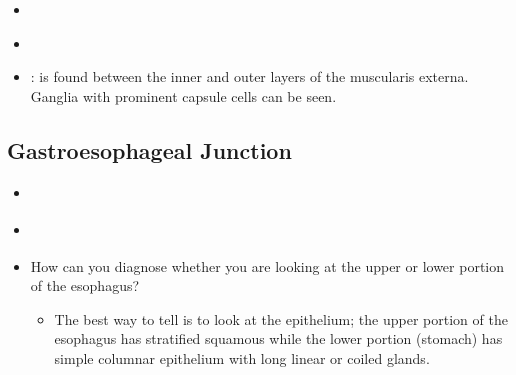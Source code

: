 \begin{itemize}
\begin{multicols}{2}
\begin{itemize}
    \item {}
    
    \begin{center}
    \end{center}

    \item {}
    
    \begin{center}
    \end{center}
    
    \item {}:  is found between the inner and outer layers of the muscularis externa. Ganglia with prominent capsule cells can be seen.
    
    \begin{center}
    \end{center}
    
  \end{itemize}
  \end{multicols}
  
  \subsection{Gastroesophageal Junction}\label{Gastroesophageal Junction}
  \begin{multicols}{2}
  \begin{itemize}
    \item {}
    
    \begin{center}
    \end{center}

    \item {}
    
    \begin{center}
    \end{center}
  \end{itemize}
  \end{multicols}
  \begin{itemize}
    \item How can you diagnose whether you are  
    looking at the upper or lower portion of the esophagus?
      \begin{itemize}
        \item The best way to tell is to look at the epithelium; the upper portion of the esophagus has stratified squamous while the lower portion (stomach) has simple columnar epithelium with long linear or coiled glands.
      \end{itemize}
  \end{itemize}


\end{itemize}
